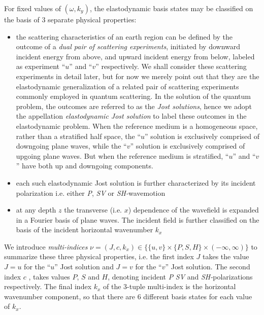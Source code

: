 For  fixed values of $(\omega, k_y)$, the  elastodynamic basis states 
may be classified on the basis of $3$ separate 
physical properties:
\begin{itemize}
\item the scattering characteristics of an earth region can be defined by the outcome of a {\em 
dual pair of scattering experiments}, initiated by downward incident 
energy from above, and upward incident energy from below, labeled as experiment ``$u$'' and ``$v$''
respectively. We shall consider these scattering experiments in detail later, but for now we
merely point out that they are the elastodynamic generalization of a related pair of
scattering experiments commonly employed in quantum scattering. In the solution of the
quantum problem, the outcomes are referred to as the {\em Jost solutions}, hence we
adopt the appellation  {\em  elastodynamic Jost solution} to label these outcomes in the
elastodynamic problem. When the reference medium is a homogeneous space, 
rather than a stratified half space,  the ``$u$'' solution is exclusively 
comprised of downgoing plane waves, while the ``$v$'' solution is exclusively 
comprised of upgoing plane waves. But when the reference medium is 
stratified,  ``$u$'' and ``$v$'' have both up and downgoing components.
\item each such elastodynamic Jost solution is further characterized by its
incident polarization  i.e. either  {\em P},  {\em SV} or {\em SH-}wavemotion
\item  at any depth $z$  the transverse (i.e. $x$) dependence  of the wavefield is expanded 
in a Fourier basis of plane 
waves.  The incident field is further classified on the basis of the incident 
horizontal wavenumber $k_{x}$
\end{itemize}
We introduce {\em multi-indices} $\nu=(J,c,k_x)\in \{ \{u,v  \} \times \{ 
P, S, H \} 
\times (-\infty, \infty)   \}$ to summarize these three 
physical properties, i.e. the first index $J$ takes the value $J=u$ for the 
``$u$'' Jost solution and $J=v$ for the ``$v$'' Jost solution. The second 
index $c$ , takes values $P$, $S$ and $H$, denoting incident {\em P} 
{\em SV} and {\em SH-}polarizations respectively.  The final index $k_x$ of the 
3-tuple multi-index is the
horizontal wavenumber component, so that there are $6$ different basis states 
for each value of $k_x$.

